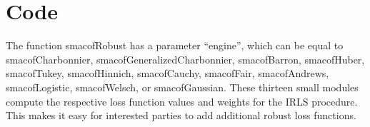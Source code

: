 \documentclass[
  12pt,
  letterpaper,
  DIV=11,
  numbers=noendperiod]{scrartcl}
\newenvironment{Shaded}{\begin{snugshade}}{\end{snugshade}}
\newcommand{\AttributeTok}[1]{\textcolor[rgb]{0.40,0.45,0.13}{#1}}
\newcommand{\ConstantTok}[1]{\textcolor[rgb]{0.56,0.35,0.01}{#1}}
\newcommand{\ControlFlowTok}[1]{\textcolor[rgb]{0.00,0.23,0.31}{\textbf{#1}}}
\newcommand{\DecValTok}[1]{\textcolor[rgb]{0.68,0.00,0.00}{#1}}
\newcommand{\FloatTok}[1]{\textcolor[rgb]{0.68,0.00,0.00}{#1}}
\newcommand{\FunctionTok}[1]{\textcolor[rgb]{0.28,0.35,0.67}{#1}}
\newcommand{\NormalTok}[1]{\textcolor[rgb]{0.00,0.23,0.31}{#1}}
\newcommand{\OtherTok}[1]{\textcolor[rgb]{0.00,0.23,0.31}{#1}}
\newcommand{\SpecialCharTok}[1]{\textcolor[rgb]{0.37,0.37,0.37}{#1}}
\newcommand{\sectionbreak}{\pagebreak}
\theoremstyle{definition}
\theoremstyle{plain}
\theoremstyle{plain}
\theoremstyle{remark}
\begin{document}
\sectionbreak

\section{Code}\label{code}

The function smacofRobust has a parameter ``engine'', which can be equal
to smacofCharbonnier, smacofGeneralizedCharbonnier, smacofBarron,
smacofHuber, smacofTukey, smacofHinnich, smacofCauchy, smacofFair,
smacofAndrews, smacofLogistic, smacofWelsch, or smacofGaussian. These
thirteen small modules compute the respective loss function values and
weights for the IRLS procedure. This makes it easy for interested
parties to add additional robust loss functions.

\begin{Shaded}
\end{Shaded}
\end{document}
